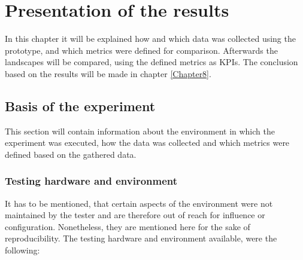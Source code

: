 \chapter{Presentation of the results} %
\label{Chapter7}


In this chapter it will be explained how and which data was collected using the prototype, and which metrics were defined for comparison.
Afterwards the landscapes will be compared, using the defined metrics as KPIs. The conclusion based on the results will be made in chapter \ref{Chapter8}.

\section{Basis of the experiment} 

This section will contain information about the environment in which the experiment was executed, how the data was collected and which metrics were defined based on the gathered data.

\subsection{Testing hardware and environment}

It has to be mentioned, that certain aspects of the environment were not maintained by the tester and are therefore out of reach for influence or configuration. Nonetheless, they are mentioned here for the sake of reproducibility.
The testing hardware and environment available, were the following:

